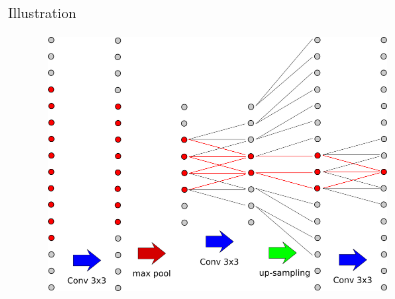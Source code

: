 \documentclass[xcolor=pdftex,dvipsnames,table,mathserif]{beamer}
\begin{document}
\begin{frame}{Illustration}

  \begin{figure}
  \includegraphics[width=0.8\textwidth]{receptive_field2.png}
  \end{figure}

\end{frame}
\end{document}
